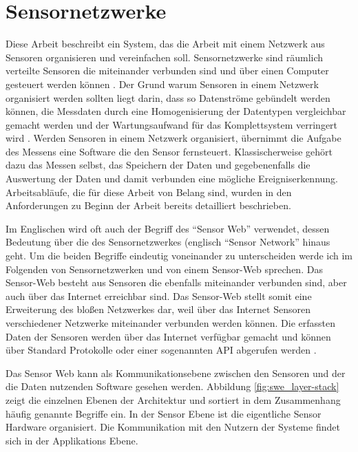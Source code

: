 \section{Sensornetzwerke}
Diese Arbeit beschreibt ein System, das die Arbeit mit einem Netzwerk aus Sensoren organisieren und vereinfachen soll. Sensornetzwerke sind räumlich verteilte Sensoren die miteinander verbunden sind und über einen Computer gesteuert werden können \citep{botts_ogc_2008}. Der Grund warum Sensoren in einem Netzwerk organisiert werden sollten liegt darin, dass so Datenströme gebündelt werden können, die Messdaten durch eine Homogenisierung der Datentypen vergleichbar gemacht werden und der Wartungsaufwand für das Komplettsystem verringert wird \citep{resch_standardisierte_2012}\citep{bermudez_ogc_2011}. Werden Sensoren in einem Netzwerk organisiert, übernimmt die Aufgabe des Messens eine Software die den Sensor fernsteuert. Klassischerweise gehört dazu das Messen selbst, das Speichern der Daten und gegebenenfalls die Auswertung der Daten und damit verbunden eine mögliche Ereigniserkennung. Arbeitsabläufe, die für diese Arbeit von Belang sind, wurden in den Anforderungen zu Beginn der Arbeit bereits detailliert beschrieben\citep{golatowski_softwarearchitektur_2003}. 

Im Englischen wird oft auch der Begriff des ``Sensor Web'' verwendet, dessen Bedeutung über die des Sensornetzwerkes (englisch ``Sensor Network'' hinaus geht. Um die beiden Begriffe eindeutig voneinander zu unterscheiden werde ich im Folgenden von Sensornetzwerken und von einem Sensor-Web sprechen. Das Sensor-Web besteht aus Sensoren die ebenfalls miteinander verbunden sind, aber auch über das Internet erreichbar sind. Das Sensor-Web stellt somit eine Erweiterung des bloßen Netzwerkes dar, weil über das Internet Sensoren verschiedener Netzwerke miteinander verbunden werden können. Die erfassten Daten der Sensoren werden über das Internet verfügbar gemacht und können über Standard Protokolle oder einer sogenannten  \gls{API} abgerufen werden \citep{broring_new_2011}\citep{botts_ogc_2008}\citep{guinard_towards_2009}.

Das Sensor Web kann als Kommunikationsebene zwischen den Sensoren und der die Daten nutzenden Software gesehen werden. Abbildung \ref{fig:swe_layer-stack} zeigt die einzelnen Ebenen der Architektur und sortiert in dem Zusammenhang häufig genannte Begriffe ein. In der Sensor Ebene ist die eigentliche Sensor Hardware organisiert. Die Kommunikation mit den Nutzern der Systeme findet sich in der Applikations Ebene.

